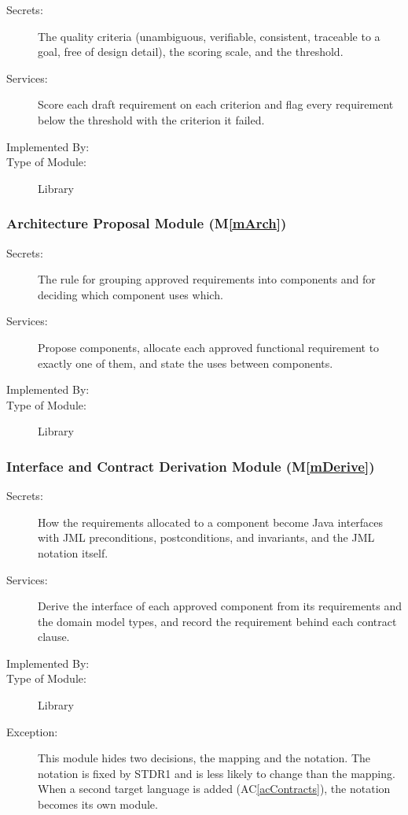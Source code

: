 \documentclass[12pt, titlepage]{article}
\newcommand{\acref}[1]{AC\ref{#1}}
\newcommand{\mref}[1]{M\ref{#1}}
\begin{document}
\begin{description}
\item[Secrets:]The quality criteria (unambiguous, verifiable, consistent,
  traceable to a goal, free of design detail), the scoring scale, and the
  threshold.
\item[Services:]Score each draft requirement on each criterion and flag every
  requirement below the threshold with the criterion it failed.
\item[Implemented By:] \progname{}
\item[Type of Module:] Library
\end{description}

\subsubsection{Architecture Proposal Module (\mref{mArch})}

\begin{description}
\item[Secrets:]The rule for grouping approved requirements into components and
  for deciding which component uses which.
\item[Services:]Propose components, allocate each approved functional
  requirement to exactly one of them, and state the uses between components.
\item[Implemented By:] \progname{}
\item[Type of Module:] Library
\end{description}

\subsubsection{Interface and Contract Derivation Module (\mref{mDerive})}

\begin{description}
\item[Secrets:]How the requirements allocated to a component become Java
  interfaces with JML preconditions, postconditions, and invariants, and the
  JML notation itself.
\item[Services:]Derive the interface of each approved component from its
  requirements and the domain model types, and record the requirement behind
  each contract clause.
\item[Implemented By:] \progname{}
\item[Type of Module:] Library
\item[Exception:] This module hides two decisions, the mapping and the
  notation. The notation is fixed by STDR1 and is less likely to change than
  the mapping. When a second target language is added (\acref{acContracts}),
  the notation becomes its own module.
\end{description}
\end{document}
